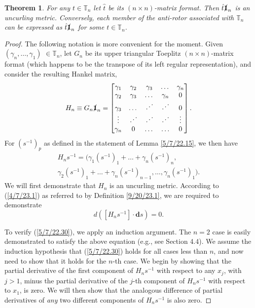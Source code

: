 \documentclass{amsart}
\numberwithin{equation}{section}
\newtheorem{theorem}{Theorem}
\theoremstyle{definition}
\numberwithin{theorem}{section}
\begin{document}
\begin{theorem} \label{5/4/22.2} For any $t\in \mathbb{T}_n$ let $\hat{t}$ be its $(n\times n)$-matrix format.    Then $\hat{t} \slashed{\bf 1}_n$ is an uncurling metric.  Conversely, each member of the anti-rotor associated with $\mathbb{T}_n$ can be expressed as $\hat{t}\slashed{\bf 1}_n$ for some $t\in \mathbb{T}_n$.   \end{theorem}


\begin{proof} The following notation is more convenient for the moment.  Given $(\gamma_n,\dots,\gamma_1)$ $\in \mathbb{T}_n$, let $G_n$ be its upper triangular Toeplitz $(n\times n)$-matrix format (which happens to be the transpose of its left regular representation), and consider the resulting Hankel matrix, 
\begin{equation}\label{5/7/22.20} H_n \equiv G_n \slashed{\bf 1}_n = \begin{bmatrix} \gamma_1 & \gamma_2 & \gamma_3 & \dots & \gamma_n \\ \gamma_2 & \gamma_3 & \dots & \gamma_n & 0 \\ \gamma_3 & \dots & \iddots & \iddots & 0  \\ \vdots & \iddots & \iddots & \iddots & \vdots \\ \gamma_n & 0 & \dots & \ldots & 0 \end{bmatrix}.\end{equation}
For $\left( s^{-1} \right)_p$ as defined in the statement of Lemma \ref{5/7/22.15}, we then have
\begin{multline}  H_n s^{-1}   =  \Big( \gamma_1\left( s^{-1} \right)_1  + \dots + \gamma_n \left( s^{-1} \right)_n, \\ \gamma_2\left( s^{-1} \right)_1  + \dots + \gamma_n \left( s^{-1} \right)_{n-1}, 
  \dots , 
 \gamma_n \left( s^{-1} \right)_1 \Big). \label{5/7/22.40}
\end{multline}
 We will first demonstrate that $H_n$ is an uncurling metric.  According to (\ref{4/7/23.1}) as referred to by Definition \ref{9/20/23.1}, we are required to demonstrate 
\begin{equation}\label{5/7/22.30} d\left([H_n s^{-1}]\cdot \mathbf{d}s\right) = 0.\end{equation}  

To verify (\ref{5/7/22.30}), we apply an induction argument.  The $n=2$ case is easily demonstrated to satisfy the above equation (e.g., see Section 4.4).  We assume the induction hypothesis that (\ref{5/7/22.30}) holds for all cases less than $n$, and now need to show that it holds for the $n$-th case.  
We begin by showing that the partial derivative of the first component of $H_n s^{-1}$ with respect to any $x_j$, with $j>1$, minus the partial derivative of the $j$-th component of $H_n s^{-1}$ with respect to $x_1$, is zero. We will then show that the analogous difference of partial derivatives of {\it any} two different components of $H_ns^{-1}$ is also zero.


\end{proof}
\end{document}
